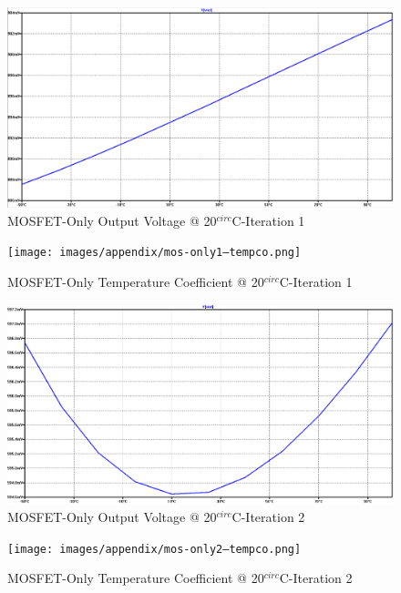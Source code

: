\begin{figure}[!htbp]
  	\centering
  	\includegraphics[scale=0.15]{images/appendix/mos-only1-vref.png}
  	\caption[output-z-meas]{MOSFET-Only Output Voltage @ 20$^{circ}$C-Iteration 1}
  	\label{fig:mos-only1-vref}
	\end{figure}
\begin{figure}[!htbp]
  	\centering
  	\texttt{[image: images/appendix/mos-only1--tempco.png]}
  	\caption[output-z-meas]{MOSFET-Only Temperature Coefficient @ 20$^{circ}$C-Iteration 1}
  	\label{fig:mos-only1-tempco}
	\end{figure}

\begin{figure}[!htbp]
  	\centering
  	\includegraphics[scale=0.15]{images/appendix/mos-only2-vref.png}
  	\caption[output-z-meas]{MOSFET-Only Output Voltage @ 20$^{circ}$C-Iteration 2}
  	\label{fig:mos-only2-vref}
	\end{figure}
\begin{figure}[!htbp]
  	\centering
  	\texttt{[image: images/appendix/mos-only2--tempco.png]}
  	\caption[output-z-meas]{MOSFET-Only Temperature Coefficient @ 20$^{circ}$C-Iteration 2}
  	\label{fig:mos-only2-tempco}
	\end{figure}

